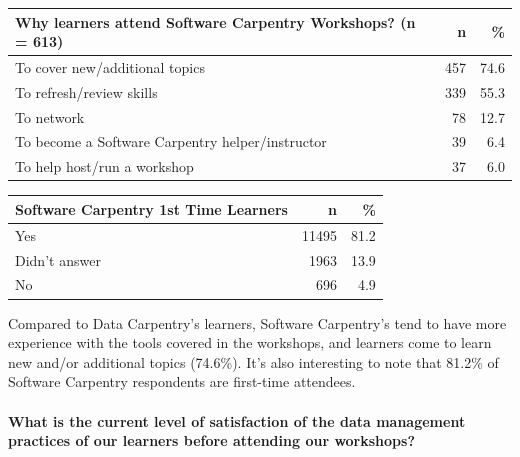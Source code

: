 \documentclass[]{article}
\let\oldparagraph\paragraph
\renewcommand{\paragraph}[1]{\oldparagraph{#1}\mbox{}}
\begin{document}
\begin{longtable}[]{@{}lrr@{}}
\toprule
Why learners attend Software Carpentry Workshops? (n = 613) & n &
\%\tabularnewline
\midrule
\endhead
To cover new/additional topics & 457 & 74.6\tabularnewline
To refresh/review skills & 339 & 55.3\tabularnewline
To network & 78 & 12.7\tabularnewline
To become a Software Carpentry helper/instructor & 39 &
6.4\tabularnewline
To help host/run a workshop & 37 & 6.0\tabularnewline
\bottomrule
\end{longtable}

\begin{longtable}[]{@{}lrr@{}}
\toprule
Software Carpentry 1st Time Learners & n & \%\tabularnewline
\midrule
\endhead
Yes & 11495 & 81.2\tabularnewline
Didn't answer & 1963 & 13.9\tabularnewline
No & 696 & 4.9\tabularnewline
\bottomrule
\end{longtable}

Compared to Data Carpentry's learners, Software Carpentry's tend to have
more experience with the tools covered in the workshops, and learners
come to learn new and/or additional topics (74.6\%). It's also
interesting to note that 81.2\% of Software Carpentry respondents are
first-time attendees.

\paragraph{What is the current level of satisfaction of the data
management practices of our learners before attending our
workshops?}\label{what-is-the-current-level-of-satisfaction-of-the-data-management-practices-of-our-learners-before-attending-our-workshops}
\end{document}
